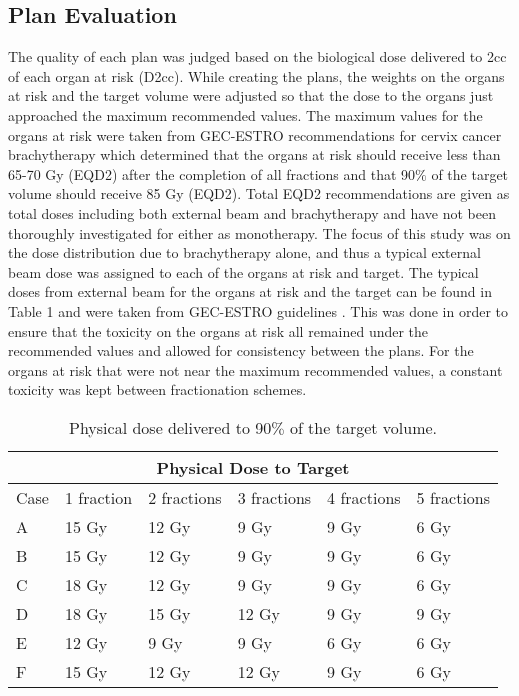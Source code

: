 \documentclass[osajnl,twocolumn,showpacs,superscriptaddress,10pt]{revtex4-1}
\begin{document}
\subsection{Plan Evaluation}
The quality of each plan was judged based on the biological dose delivered to 2cc of each organ at risk (D2cc). While creating the plans, the weights on the organs at risk and the target volume were adjusted so that the dose to the organs just approached the maximum recommended values. The maximum values for the organs at risk were taken from GEC-ESTRO recommendations for cervix cancer brachytherapy which determined that the organs at risk should receive less than 65-70 Gy (EQD2) after the completion of all fractions and that 90$\%$ of the target volume should receive 85 Gy (EQD2). Total EQD2 recommendations are given as total doses including both external beam and brachytherapy and have not been thoroughly investigated for either as monotherapy. The focus of this study was on the dose distribution due to brachytherapy alone, and thus a typical external beam dose was assigned to each of the organs at risk and target. The typical doses from external beam for the organs at risk and the target can be found in Table 1 and were taken from GEC-ESTRO guidelines \cite{GECESTRO}. This was done in order to ensure that the toxicity on the organs at risk all remained under the recommended values and allowed for consistency between the plans. For the organs at risk that were not near the maximum recommended values, a constant toxicity was kept between fractionation schemes. 

\begin{table*}\label{table}
\setlength{\tabcolsep}{1.75em}
\centering
\vspace{0.25in}
\begin{tabular}{llllll}
\hline
\multicolumn{6}{c}{Physical Dose to Target} \\
\hline
Case & 1 fraction & 2 fractions & 3 fractions & 4 fractions & 5 fractions\\
\hline
A & 15 Gy & 12 Gy & 9 Gy & 9 Gy & 6 Gy\\
B & 15 Gy & 12 Gy & 9 Gy & 9 Gy & 6 Gy\\
C & 18 Gy & 12 Gy & 9 Gy & 9 Gy & 6 Gy\\
D & 18 Gy & 15 Gy & 12 Gy & 9 Gy & 9 Gy\\
E & 12 Gy & 9 Gy & 9 Gy & 6 Gy & 6 Gy\\
F & 15 Gy & 12 Gy & 12 Gy & 9 Gy & 6 Gy\\
\hline
\end{tabular}
\caption{Physical dose delivered to 90$\%$ of the target volume.}
\end{table*}
\end{document}
